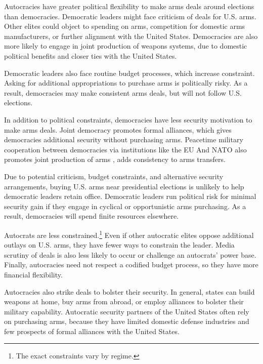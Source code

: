 \documentclass[12pt]{article}
\begin{document}
Autocracies have greater political flexibility to make arms deals around elections than democracies. 
Democratic leaders might face criticism of deals for U.S. arms.
Other elites could object to spending on arms, competition for domestic arms manufacturers, or further alignment with the United States.
Democracies are also more likely to engage in joint production of weapons systems, due to domestic political benefits and closer ties with the United States.


Democratic leaders also face routine budget processes, which increase constraint.
Asking for additional appropriations to purchase arms is politically risky. 
As a result, democracies may make consistent arms deals, but will not follow U.S. elections.


In addition to political constraints, democracies have less security motivation to make arms deals. 
Joint democracy promotes formal alliances, which gives democracies additional security without purchasing arms. 
Peacetime military cooperation between democracies via institutions like the EU And NATO also promotes joint production of arms \citep{Klare1983, Bitzinger1994}, adds consistency to arms transfers. 


Due to potential criticism, budget constraints, and alternative security arrangements, buying U.S. arms near presidential elections is unlikely to help democratic leaders retain office.
Democratic leaders run political risk for minimal security gain if they engage in cyclical or opportunistic arms purchasing. 
As a result, democracies will spend finite resources elsewhere. 


Autocrats are less constrained.\footnote{The exact constraints vary by regime.}
Even if other autocratic elites oppose additional outlays on U.S. arms, they have fewer ways to constrain the leader.
Media scrutiny of deals is also less likely to occur or challenge an autocrats' power base. 
Finally, autocracies need not respect a codified budget process, so they have more financial flexibility.  


Autocracies also strike deals to bolster their security.
In general, states can build weapons at home, buy arms from abroad, or employ alliances to bolster their military capability. 
Autocratic security partners of the United States often rely on purchasing arms, because they have limited domestic defense industries and few prospects of formal alliances with the United States. 
\end{document}
